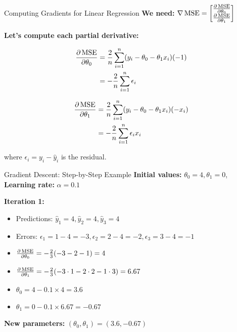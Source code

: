 \documentclass[usenames,dvipsnames]{beamer}
\begin{document}
  \begin{frame}{Computing Gradients for Linear Regression}
    \textbf{We need:} $\nabla \operatorname{MSE} = \begin{bmatrix} \frac{\partial \operatorname{MSE}}{\partial \theta_0} \\ \frac{\partial \operatorname{MSE}}{\partial \theta_1} \end{bmatrix}$
    
    \pause
    \textbf{Let's compute each partial derivative:}
    
    \begin{align}
        \frac{\partial \operatorname{MSE}}{\partial \theta_0} &= \frac{2}{n}\sum_{i=1}^n (y_i - \theta_0 - \theta_1 x_i)(-1)\\
        &= -\frac{2}{n}\sum_{i=1}^n \epsilon_i
    \end{align}
    
    \pause
    \begin{align}
        \frac{\partial \operatorname{MSE}}{\partial \theta_1} &= \frac{2}{n}\sum_{i=1}^n (y_i - \theta_0 - \theta_1 x_i)(-x_i)\\
        &= -\frac{2}{n}\sum_{i=1}^n \epsilon_i x_i
    \end{align}
    
    where $\epsilon_i = y_i - \hat{y}_i$ is the residual.
  \end{frame}

  \begin{frame}{Gradient Descent: Step-by-Step Example}
    \textbf{Initial values:} $\theta_0 = 4, \theta_1 = 0$, \textbf{Learning rate:} $\alpha = 0.1$
    
    \pause
    \textbf{Iteration 1:}
    \begin{itemize}[<+->]
        \item Predictions: $\hat{y}_1 = 4, \hat{y}_2 = 4, \hat{y}_3 = 4$
        \item Errors: $\epsilon_1 = 1-4 = -3, \epsilon_2 = 2-4 = -2, \epsilon_3 = 3-4 = -1$
        \item $\frac{\partial \operatorname{MSE}}{\partial \theta_0} = -\frac{2}{3}(-3-2-1) = 4$
        \item $\frac{\partial \operatorname{MSE}}{\partial \theta_1} = -\frac{2}{3}(-3 \cdot 1 - 2 \cdot 2 - 1 \cdot 3) = 6.67$
        \item $\theta_0 = 4 - 0.1 \times 4 = 3.6$
        \item $\theta_1 = 0 - 0.1 \times 6.67 = -0.67$
    \end{itemize}
    
    \pause
    \textbf{New parameters:} $(\theta_0, \theta_1) = (3.6, -0.67)$
  \end{frame}
\end{document}
